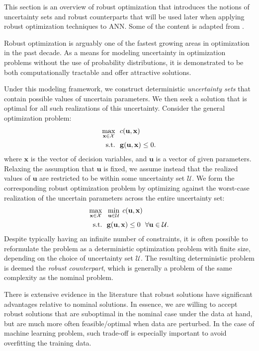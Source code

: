 \documentclass[twoside,12pt]{article}
\newcommand{\M}[1]{\boldsymbol{\mathbf{#1}}}
\newcommand{\V}{\M}
\newcommand{\Cal}{\mathcal}
\begin{document}
This section is an overview of robust optimization that introduces the notions of uncertainty sets and robust counterparts that will be used later when applying robust optimization techniques to ANN. Some of the content is adapted from \cite{bertsimas2015robust}.

Robust optimization is arguably one of the fastest growing areas in optimization in the past decade. As a means for modeling uncertainty in optimization problems without the use of probability distributions, it is demonstrated to be both computationally tractable and offer attractive solutions.

Under this modeling framework, we construct deterministic \emph{uncertainty sets} that contain possible values of uncertain parameters. We then seek a solution that is optimal for all such realizations of this uncertainty. Consider the general optimization problem:
\[
\begin{aligned}
  \max_{\V x \in \Cal X} ~~ & c(\V u, \V x)\\
  \textup{s.t.} ~~ & \V g (\V u, \V x) \le 0.
\end{aligned}
\]
where $\V x$ is the vector of decision variables, and $\V u$ is a vector of given parameters. Relaxing the assumption that $\V u$ is fixed, we assume instead that the realized values of $\V u$ are restricted to be within some uncertainty set $\Cal U$. We form the corresponding robust optimization problem by optimizing against the worst-case realization of the uncertain parameters across the entire uncertainty set:
\[
\begin{aligned}
  \max_{\V x \in \Cal X} ~~ & \min_{\V u \in \Cal U} \; c(\V u, \V x) \\
  \textup{s.t.} ~~ & \V g (\V u, \V x) \le 0 ~~ \forall \V u \in \Cal U.
\end{aligned}
\]
Despite typically having an infinite number of constraints, it is often possible to reformulate the problem as a deterministic optimization problem with finite size, depending on the choice of uncertainty set $\Cal U$. The resulting deterministic problem is deemed the \emph{robust counterpart}, which is generally a problem of the same complexity as the nominal problem.


There is extensive evidence in the literature that robust solutions have significant advantages relative to nominal solutions. In essence, we are willing to accept robust solutions that are suboptimal in the nominal case under the data at hand, but are much more often feasible/optimal when data are perturbed. In the case of machine learning problem, such trade-off is especially important to avoid overfitting the training data.
\end{document}

